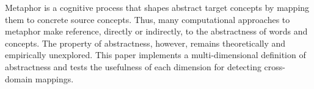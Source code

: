 Metaphor is a cognitive process that shapes abstract target concepts by mapping them to concrete source concepts. Thus, many computational approaches to metaphor make reference, directly or indirectly, to the abstractness of words and concepts. The property of abstractness, however, remains theoretically and empirically unexplored. This paper implements a multi-dimensional definition of abstractness and tests the usefulness of each dimension for detecting cross-domain mappings.
